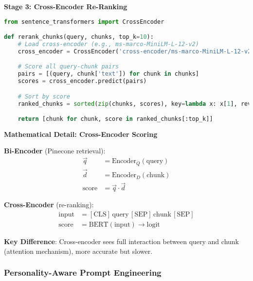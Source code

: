 \documentclass[10pt]{article}
\begin{document}
\textbf{Stage 3: Cross-Encoder Re-Ranking}
\begin{lstlisting}[language=Python]
from sentence_transformers import CrossEncoder

def rerank_chunks(query, chunks, top_k=10):
    # Load cross-encoder (e.g., ms-marco-MiniLM-L-12-v2)
    cross_encoder = CrossEncoder('cross-encoder/ms-marco-MiniLM-L-12-v2')

    # Score all query-chunk pairs
    pairs = [(query, chunk['text']) for chunk in chunks]
    scores = cross_encoder.predict(pairs)

    # Sort by score
    ranked_chunks = sorted(zip(chunks, scores), key=lambda x: x[1], reverse=True)

    return [chunk for chunk, score in ranked_chunks[:top_k]]
\end{lstlisting}

\textbf{Mathematical Detail: Cross-Encoder Scoring}

\textbf{Bi-Encoder} (Pinecone retrieval):
\begin{align*}
\vec{q} &= \text{Encoder}_Q(\text{query}) \\
\vec{d} &= \text{Encoder}_D(\text{chunk}) \\
\text{score} &= \vec{q} \cdot \vec{d}
\end{align*}

\textbf{Cross-Encoder} (re-ranking):
\begin{align*}
\text{input} &= [\text{CLS}] \, \text{query} \, [\text{SEP}] \, \text{chunk} \, [\text{SEP}] \\
\text{score} &= \text{BERT}(\text{input}) \rightarrow \text{logit}
\end{align*}

\textbf{Key Difference}: Cross-encoder sees full interaction between query and chunk (attention mechanism), more accurate but slower.

\subsubsection{Personality-Aware Prompt Engineering}
\end{document}
